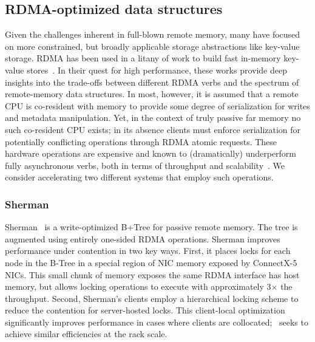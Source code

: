 \subsection{RDMA-optimized data structures}

Given the challenges inherent in full-blown remote memory, many have
focused on more constrained, but broadly applicable storage
abstractions like key-value storage.  RDMA has been used in a litany
of work to build fast in-memory key-value
stores~\cite{farm,MemC3,herd,pilaf,sonuma,storm}. In their quest for
high performance, these works provide deep insights into the
trade-offs between different RDMA verbs and the spectrum of
remote-memory data structures. In most, however, it is assumed that a
remote CPU is co-resident with memory to provide some degree of
serialization for writes and metadata manipulation. Yet, in the
context of truly passive far memory no such co-resident CPU exists;
in its absence clients must enforce serialization for potentially
conflicting operations through RDMA atomic requests. These
hardware operations are expensive and known to (dramatically)
underperform fully asynchronous verbs, both in terms of throughput and
scalability~\cite{design-guidelines}.  We consider accelerating two
different systems that employ such operations.

\subsubsection{Sherman}

Sherman~\cite{sherman} is a write-optimized B+Tree for passive remote memory. The
tree is augmented using entirely one-sided RDMA operations. Sherman
improves performance under contention in two key ways. First, it
places locks for each node in the B-Tree in a special region of NIC
memory exposed by ConnectX-5 NICs.  This small chunk of memory exposes
the same RDMA interface has host memory, but allows locking operations
to execute with approximately 3$\times$ the throughput.  Second,
Sherman's clients employ a hierarchical locking scheme to reduce the
contention for server-hosted locks.  This client-local optimization
significantly improves performance in cases where clients are
collocated; \sword\ seeks to achieve similar efficiencies at the rack
scale.




